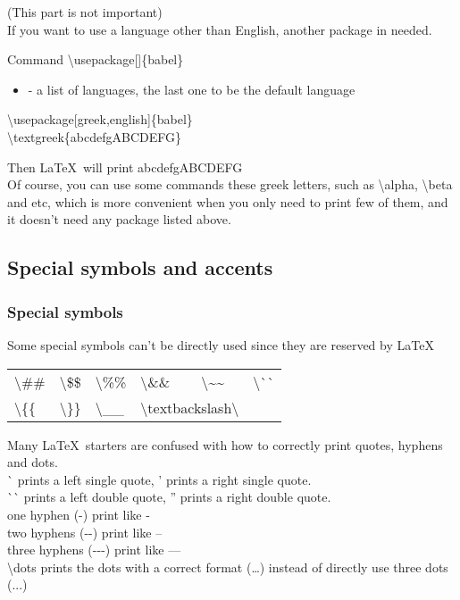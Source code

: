 \documentclass{beamer}
\newenvironment{command}{\begin{block}{Command}}{\end{block}}
\newcommand{\samplesymbol}[2]{\alert{\textbackslash #1}\quad #2}
\begin{document}
\begin{frame}
	(This part is not important)\\
	If you want to use a language other than English, another package  in needed.
	\begin{command}
		\alert{\textbackslash usepackage}[]\{babel\}
		\begin{itemize}
			\item {} - a list of languages, the last one to be the default language
		\end{itemize}
	\end{command}
	\begin{example}
		\alert{\textbackslash usepackage}[greek,english]\{babel\}\\
		\alert{\textbackslash textgreek}\{abcdefgABCDEFG\}\\
	\end{example}
	Then \LaTeX\ will print \textgreek{abcdefgABCDEFG}\\
	Of course, you can use some commands these greek letters, such as \alert{\textbackslash alpha}, \alert{\textbackslash beta} and etc, which is more convenient when you only need to print few of them, and it doesn't need any package listed above.
\end{frame}

\subsection{Special symbols and accents}

\begin{frame}
	\frametitle{Special symbols}
	Some special symbols can't be directly used since they are reserved by \LaTeX
	\begin{center}
	\begin{tabular}{llllll}
		\samplesymbol{\#}{\#} & \samplesymbol{\$}{\$} & \samplesymbol{\%}{\%} & \samplesymbol{\&}{\&} & \samplesymbol{\~{}}{\~{}} & \samplesymbol{\`{}}{\`{}} \\
		\samplesymbol{\{}{\{} & \samplesymbol{\}}{\}} & \samplesymbol{\_}{\_} &
		\multicolumn{2}{l}{\samplesymbol{textbackslash}{\textbackslash}}
	\end{tabular}
	\end{center}
	Many \LaTeX\ starters are confused with how to correctly print quotes, hyphens and dots.\\
	\`{} prints a left single quote, ' prints a right single quote.\\
	\`{}\`{} prints a left double quote, '' prints a right double quote.\\
	one hyphen (-) print like - \\
	two hyphens ({-}{-}) print like -- \\
	three hyphens ({-}{-}{-}) print like ---\\
	\alert{\textbackslash dots} prints the dots with a correct format (\dots) instead of directly use three dots (...)
\end{frame}
\end{document}
